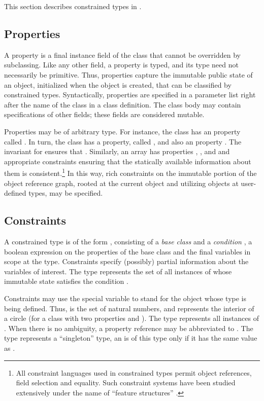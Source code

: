 This section describes constrained types in \Xten{}.

\subsection{Properties}

A property is a  final instance field of the
class that cannot be overridden by subclassing. Like any other field,
a property is typed, and its type need not necessarily be
primitive. Thus, properties capture the immutable public state of an
object, initialized when the object is created, that can be
classified by constrained types. Syntactically, properties are
specified in a parameter list right after the name of the class in a
class definition. The class body may contain specifications of other
fields; these fields are considered mutable.

Properties may be of arbitrary type. For instance, the class
 has an  property called . In turn, the
class  has a  property, called , and
also an  property .  The invariant for 
ensures that . Similarly, an array has
properties , , and 
and appropriate constraints ensuring that the statically available
information about them is consistent.\footnote{All constraint
languages used in constrained types permit object references, field
selection and equality. Such constraint systems have been studied
extensively under the name of ``feature structures''
\cite{feature-structures}.}
%
In this way, rich  
constraints on the immutable portion of
the object reference graph, rooted at the current object and utilizing
objects at user-defined types, may be specified.

\subsection{Constraints}
A constrained type is of the form , consisting of a
{\em base class}  and a {\em condition} , a
boolean expression on the properties of the base class and the
final variables in scope at the type.  Constraints specify
(possibly) partial information about the variables of interest.
The type  represents the set of all
instances of  whose immutable state satisfies the
condition .

Constraints may use the special variable  to stand for
the object whose type is being defined. Thus,  is
the set of natural numbers, and 
represents the interior of a circle (for a class  with two
 properties  and ). The type
 represents all instances of . When there is no
ambiguity, a property reference  may be abbreviated
to . The type  represents a ``singleton'' type, an
 is of this type only if it has the same value as .

